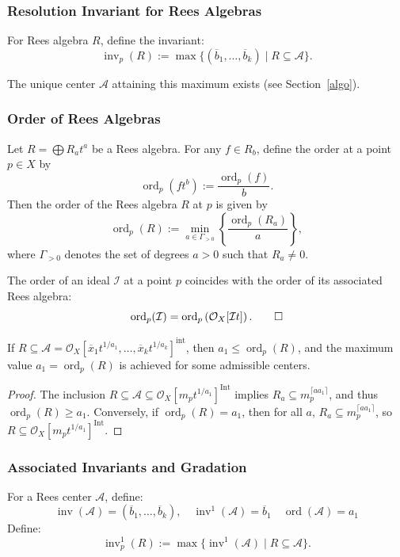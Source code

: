 \documentclass{amsart}
\newcommand{\cA}{{\mathcal A}}
\newcommand{\cI}{{\mathcal I}}
\newcommand{\cO}{{\mathcal O}}
\newcommand{\Int}{{\operatorname{Int}}}
\newcommand{\ord}{{\operatorname{ord}}}
\newcommand{\inv}{{\operatorname{inv}}}
\begin{document}
\subsubsection{Resolution Invariant for Rees Algebras}
\begin{definition}
For Rees algebra $R$, define the invariant:
\[ \inv_p(R) := \max \{ (\overline{b}_1, \ldots, \overline{b}_k) \mid R \subseteq \cA \}. \]
\end{definition}

\begin{remark}
The unique center $\cA$ attaining this maximum exists (see Section~\ref{algo}).
\end{remark}

\subsubsection{Order of Rees Algebras}
\begin{definition}
Let \( R = \bigoplus R_a t^a \) be a Rees algebra. For any \( f \in R_b \), define the order at a point \( p \in X \) by
\[
\ord_p(ft^b) := \frac{\ord_p(f)}{b}.
\]
Then the order of the Rees algebra \( R \) at \( p \) is given by
\[
\ord_p(R) := \min_{a \in \Gamma_{>0}} \left\{ \frac{\ord_p(R_a)}{a} \right\},
\]
where \( \Gamma_{>0} \) denotes the set of degrees \( a > 0 \) such that \( R_a \neq 0 \).
\end{definition}

\begin{lemma}
The order of an ideal $\cI$ at a point $p$ coincides with the order of its associated Rees algebra:
\[
\ord_p(\cI) = \ord_p\left(\cO_X[\cI t]\right). \qed
\]

\end{lemma}
\begin{lemma}\label{order}
If \( R \subseteq \mathcal{A} = \mathcal{O}_X[\overline{x}_1 t^{1/a_1}, \ldots, \overline{x}_k t^{1/a_k}]^{\mathrm{int}} \), then \( a_1 \leq \ord_p(R) \), and the maximum value \( a_1 = \ord_p(R) \) is achieved for some admissible centers.
\end{lemma}
\begin{proof}
The inclusion $R \subseteq \cA \subseteq \cO_X[m_pt^{1/a_1}]^\Int$ implies $R_a \subseteq m_p^{\lceil a a_1 \rceil}$, and thus $\ord_p(R) \geq a_1$. Conversely, if $\ord_p(R) = a_1$, then for all $a$, $R_a \subseteq m_p^{\lceil a a_1 \rceil}$, so $R \subseteq \cO_X[m_pt^{1/a_1}]^\Int$.
\end{proof}

\subsubsection{Associated Invariants and Gradation}
For a Rees center $\cA$, define:
\[ \inv(\cA) = (\overline{b}_1, \ldots, \overline{b}_k), \quad \inv^1(\cA) = \overline{b}_1 \quad \ord(\cA)=a_1\]
Define:
\[ \inv^1_p(R) := \max \{ \inv^1(\cA) \mid R \subseteq \cA \}. \]
\end{document}
